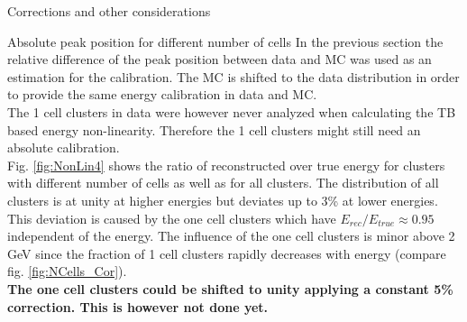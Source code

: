 \documentclass[ALICE]{ALICE_analysis_notes}
\begin{document}
\begin{section}{Corrections and other considerations}
\begin{subsubsection}{Absolute peak position for different number of cells}
 In the previous section the relative difference of the peak position between data and MC was used as an estimation for the calibration. The MC is shifted to the data distribution in order to provide the same energy calibration in data and MC. \\
 The 1 cell clusters in data were however never analyzed when calculating the TB based energy non-linearity. Therefore the 1 cell clusters might still need an absolute calibration. \\
 Fig. \ref{fig:NonLin4} shows the ratio of reconstructed over true energy for clusters with different number of cells as well as for all clusters. The distribution of all clusters is at unity at higher energies but deviates up to 3\% at lower energies. This deviation is caused by the one cell clusters which have $E_{rec}/E_{true}\approx0.95$ independent of the energy. The influence of the one cell clusters is minor above 2 GeV since the fraction of 1 cell clusters rapidly decreases with energy (compare fig. \ref{fig:NCells_Cor}).\\
 \textbf{The one cell clusters could be shifted to unity applying a constant 5\% correction. This is however not done yet.} 


\end{subsubsection}



\end{section}
\end{document}
